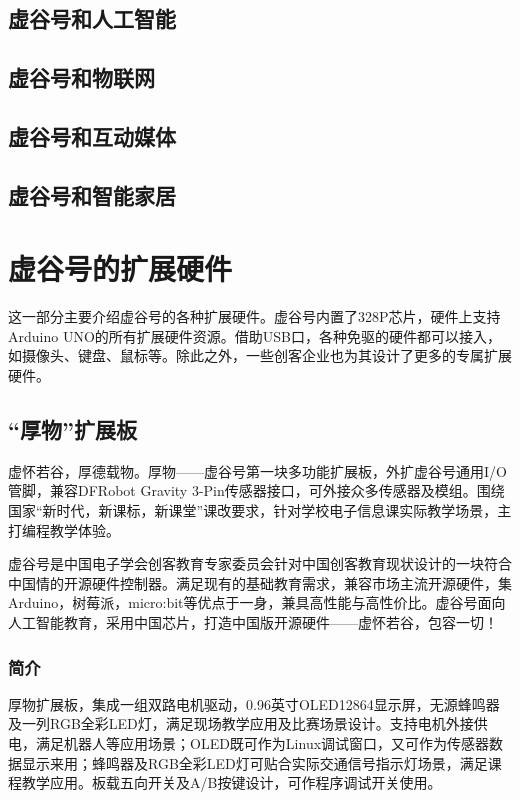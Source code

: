 \documentclass[letterpaper,10pt,english]{sphinxmanual}
\begin{document}
\section{虚谷号和人工智能}
\label{\detokenize{06.edu/6.1::doc}}\label{\detokenize{06.edu/6.1:id1}}

\section{虚谷号和物联网}
\label{\detokenize{06.edu/6.2::doc}}\label{\detokenize{06.edu/6.2:id1}}

\section{虚谷号和互动媒体}
\label{\detokenize{06.edu/6.3::doc}}\label{\detokenize{06.edu/6.3:id1}}

\section{虚谷号和智能家居}
\label{\detokenize{06.edu/6.4::doc}}\label{\detokenize{06.edu/6.4:id1}}

\chapter{虚谷号的扩展硬件}
\label{\detokenize{07.plus/index::doc}}\label{\detokenize{07.plus/index:id1}}
这一部分主要介绍虚谷号的各种扩展硬件。虚谷号内置了328P芯片，硬件上支持Arduino UNO的所有扩展硬件资源。借助USB口，各种免驱的硬件都可以接入，如摄像头、键盘、鼠标等。除此之外，一些创客企业也为其设计了更多的专属扩展硬件。


\section{“厚物”扩展板}
\label{\detokenize{07.plus/7.1-houwu::doc}}\label{\detokenize{07.plus/7.1-houwu:id1}}
虚怀若谷，厚德载物。厚物——虚谷号第一块多功能扩展板，外扩虚谷号通用I/O管脚，兼容DFRobot Gravity 3-Pin传感器接口，可外接众多传感器及模组。围绕国家“新时代，新课标，新课堂”课改要求，针对学校电子信息课实际教学场景，主打编程教学体验。

虚谷号是中国电子学会创客教育专家委员会针对中国创客教育现状设计的一块符合中国情的开源硬件控制器。满足现有的基础教育需求，兼容市场主流开源硬件，集Arduino，树莓派，micro:bit等优点于一身，兼具高性能与高性价比。虚谷号面向人工智能教育，采用中国芯片，打造中国版开源硬件——虚怀若谷，包容一切！


\subsection{简介}
\label{\detokenize{07.plus/7.1-houwu:id2}}
厚物扩展板，集成一组双路电机驱动，0.96英寸OLED12864显示屏，无源蜂鸣器及一列RGB全彩LED灯，满足现场教学应用及比赛场景设计。支持电机外接供电，满足机器人等应用场景；OLED既可作为Linux调试窗口，又可作为传感器数据显示来用；蜂鸣器及RGB全彩LED灯可贴合实际交通信号指示灯场景，满足课程教学应用。板载五向开关及A/B按键设计，可作程序调试开关使用。
\end{document}
